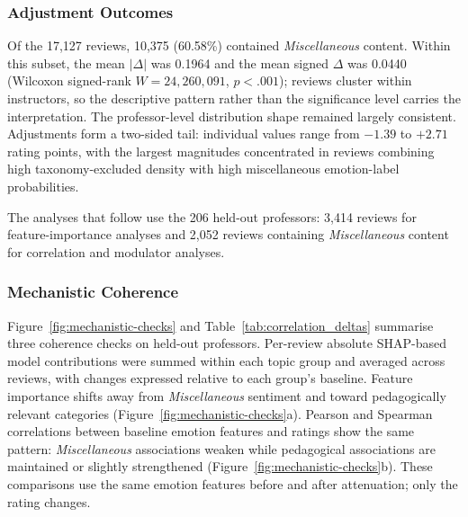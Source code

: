 \documentclass[fleqn,10pt]{JLA_article}
\begin{document}
\subsubsection{Adjustment Outcomes}

Of the 17,127 reviews, 10,375 (60.58\%) contained \textit{Miscellaneous} content. Within this subset, the mean $|\Delta|$ was 0.1964 and the mean signed $\Delta$ was 0.0440 (Wilcoxon signed-rank $W = 24{,}260{,}091$, $p < .001$); reviews cluster within
instructors, so the descriptive pattern rather than the significance level
carries the interpretation. The professor-level distribution shape remained largely consistent. Adjustments form a two-sided tail: individual values range from $-1.39$ to $+2.71$ rating points, with the largest magnitudes concentrated in reviews combining high taxonomy-excluded density with high miscellaneous emotion-label probabilities.

The analyses that follow use the 206 held-out professors: 3,414 reviews for feature-importance analyses and 2,052 reviews containing \textit{Miscellaneous} content for correlation and modulator analyses.

\subsubsection{Mechanistic Coherence}

Figure~\ref{fig:mechanistic-checks} and Table~\ref{tab:correlation_deltas} summarise three coherence checks on held-out professors.  Per-review absolute SHAP-based model contributions were summed within each topic group and averaged across reviews, with changes expressed relative to each group's baseline. Feature importance shifts away from \textit{Miscellaneous} sentiment and toward pedagogically relevant categories (Figure~\ref{fig:mechanistic-checks}a). Pearson and Spearman correlations between baseline emotion features and ratings show the same pattern: \textit{Miscellaneous} associations weaken while pedagogical associations are maintained or slightly strengthened (Figure~\ref{fig:mechanistic-checks}b). These comparisons use the same emotion features before and after attenuation; only the rating changes.
\end{document}
